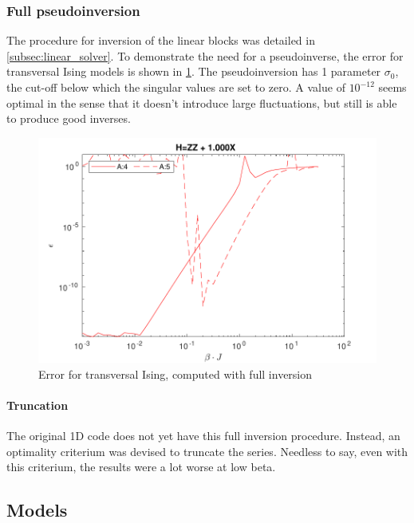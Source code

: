 \subsubsection{Full pseudoinversion}

The procedure for inversion of the linear blocks was detailed in \cref{subsec:linear_solver}. To demonstrate the need for a pseudoinverse, the error for transversal Ising models is shown in \cref{benc:fig:fullinv}. The pseudoinversion has 1 parameter $\sigma_0$, the cut-off below which the singular values are set to zero. A value of $10^{-12}$ seems optimal in the sense that it doesn't introduce large fluctuations, but still is able to produce good inverses.

\begin{figure}[H]
    \center
    \includegraphics[width=\textwidth]{Figuren/benchmarking/t_ising_full_inverse.pdf }
    \caption{Error for transversal Ising, computed with full inversion }
    \label{benc:fig:fullinv}
\end{figure}

\paragraph{Truncation}

The original 1D code does not yet have this full inversion procedure. Instead, an optimality criterium was devised to truncate the series. Needless to say, even with this criterium, the results were a lot worse at low beta.

\subsection{Models}

